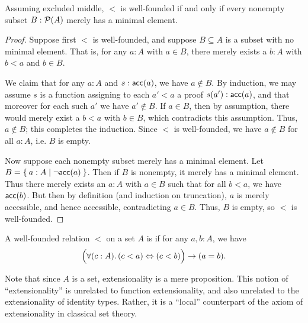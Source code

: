 \begin{lem}\label{thm:wfmin}
  Assuming excluded middle, $<$ is well-founded if and only if every nonempty subset $B: \mathcal{P}(A)$ merely has a minimal element.
\end{lem}
\begin{proof}
  Suppose first $<$ is well-founded, and suppose $B\subseteq A$ is a subset with no minimal element.
  That is, for any $a:A$ with $a\in B$, there merely exists a $b:A$ with $b<a$ and $b\in B$.

  We claim that for any $a:A$ and $s:\mathsf{acc}(a)$, we have $a\notin B$.
  By induction, we may assume $s$ is a function assigning to each $a'<a$ a proof $s(a'):\mathsf{acc}(a)$, and that moreover for each such $a'$ we have $a'\notin B$.
  If $a\in B$, then by assumption, there would merely exist a $b<a$ with $b\in B$, which contradicts this assumption.
  Thus, $a\notin B$; this completes the induction.
  Since $<$ is well-founded, we have $a\notin B$ for all $a:A$, i.e. $B$ is empty.

  Now suppose each nonempty subset merely has a minimal element.
  Let $B = \Set{ a:A | \neg \ensuremath{\mathsf{acc}}(a) }$.
  Then if $B$ is nonempty, it merely has a minimal element.
  Thus there merely exists an $a:A$ with $a\in B$ such that for all $b<a$, we have $\mathsf{acc}(b)$.
  But then by definition (and induction on truncation), $a$ is merely accessible, and hence accessible, contradicting $a\in B$.
  Thus, $B$ is empty, so $<$ is well-founded.
\end{proof}

\begin{defn}
  A well-founded relation $<$ on a set $A$ is 
  if for any $a,b:A$, we have
  \[ \Parens{\fall{c:A} (c<a) \Leftrightarrow (c<b)} \to (a=b). \]
\end{defn}

Note that since $A$ is a set, extensionality is a mere proposition.
This notion of ``extensionality'' is unrelated to function extensionality, and also unrelated to the extensionality of identity types.
%
Rather, it is a ``local'' counterpart of the axiom of extensionality in classical set theory.

